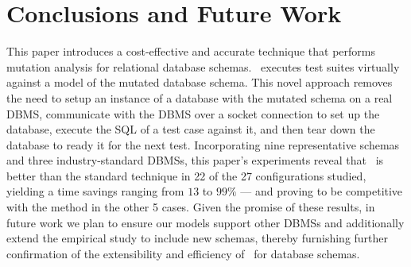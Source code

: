 
\vspace*{-.5em}

\section{Conclusions and Future Work}
\label{sec:conclusions}


This paper introduces a cost-effective and accurate technique that performs mutation analysis for relational database schemas. \Vma~executes test suites virtually against a model of the mutated database schema. This novel approach removes the need to setup an instance of a database with the mutated schema on a real DBMS, communicate with the DBMS over a socket connection to set up the database, execute the SQL \INSERTs of a test case against it, and then tear down the database to ready it for the next test. Incorporating nine representative schemas and three industry-standard DBMSs, this paper's experiments reveal that \vma~is better than the standard technique in 22 of the 27 configurations studied, yielding a time savings ranging from $13$ to $99\%$ --- and proving to be competitive with the \Original method in the other 5 cases.  Given the promise of these results, in future work we plan to ensure our models support other DBMSs and additionally extend the empirical study to include new schemas, thereby furnishing further confirmation of the extensibility and efficiency of \vma~for database schemas.

